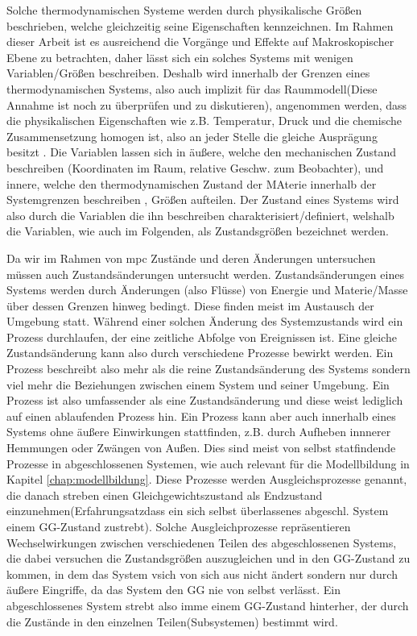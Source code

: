 Solche thermodynamischen Systeme werden durch physikalische Größen beschrieben, welche gleichzeitig seine Eigenschaften kennzeichnen. Im Rahmen dieser Arbeit ist es ausreichend die Vorgänge und Effekte auf Makroskopischer Ebene zu betrachten, daher lässt sich ein solches Systems mit wenigen Variablen/Größen beschreiben.
Deshalb wird innerhalb der Grenzen eines thermodynamischen Systems, also auch implizit für das Raummodell(Diese Annahme ist noch zu überprüfen und zu diskutieren), angenommen werden, dass die physikalischen Eigenschaften wie z.B. Temperatur, Druck und die chemische Zusammensetzung homogen ist, also an jeder Stelle die gleiche Ausprägung besitzt \cite[S.15]{ba12} . 
Die Variablen lassen sich in äußere, welche den mechanischen Zustand beschreiben (Koordinaten im Raum, relative Geschw. zum Beobachter), und innere, welche den thermodynamischen Zustand der MAterie innerhalb der Systemgrenzen beschreiben , Größen aufteilen.
Der Zustand eines Systems wird also durch die Variablen die ihn beschreiben charakterisiert/definiert, welshalb die Variablen, wie auch im Folgenden, als Zustandsgrößen bezeichnet werden.
\cite[S.13~f.]{ba12}


Da wir im Rahmen von \acrlong{mpc} Zustände und deren Änderungen untersuchen müssen auch Zustandsänderungen untersucht werden. Zustandsänderungen eines Systems werden durch Änderungen (also Flüsse) von Energie und Materie/Masse über dessen Grenzen hinweg bedingt. Diese finden meist im Austausch der Umgebung statt. Während einer solchen Änderung des Systemzustands wird ein Prozess durchlaufen, der eine zeitliche Abfolge von Ereignissen ist. Eine gleiche Zustandsänderung kann also durch verschiedene Prozesse bewirkt werden. Ein Prozess beschreibt also mehr als die reine Zustandsänderung des Systems sondern viel mehr die Beziehungen zwischen einem System und seiner Umgebung. 
Ein Prozess ist also umfassender als eine Zustandsänderung und diese weist lediglich auf einen ablaufenden Prozess hin.
Ein Prozess kann aber auch innerhalb eines Systems ohne äußere Einwirkungen stattfinden, z.B. durch Aufheben innnerer Hemmungen oder Zwängen von Außen. Dies sind meist von selbst statfindende Prozesse in abgeschlossenen Systemen, wie auch relevant für die Modellbildung in Kapitel \ref{chap:modellbildung}. Diese Prozesse werden Ausgleichsprozesse genannt, die danach streben einen Gleichgewichtszustand als Endzustand einzunehmen(\Gun Erfahrungsatz\Gob dass ein sich selbst überlassenes abgeschl. System einem GG-Zustand zustrebt). Solche Ausgleichprozesse repräsentieren Wechselwirkungen zwischen verschiedenen Teilen des abgeschlossenen Systems, die dabei versuchen die Zustandsgrößen auszugleichen und in den GG-Zustand zu kommen, in dem das System vsich von sich aus nicht ändert sondern nur durch äußere Eingriffe, da das System den GG nie von selbst verlässt. Ein abgeschlossenes System strebt also imme einem GG-Zustand hinterher, der durch die Zustände in den einzelnen Teilen(Subsystemen) bestimmt wird. 
\cite[S.21~f.]{ba12}

